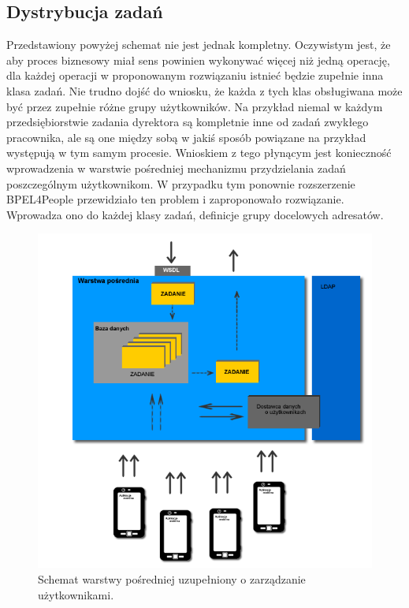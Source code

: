\subsection{Dystrybucja zadań}
Przedstawiony powyżej schemat nie jest jednak kompletny. Oczywistym jest, że aby proces biznesowy miał sens powinien wykonywać więcej niż jedną operację, dla każdej operacji w proponowanym rozwiązaniu istnieć będzie zupełnie inna klasa zadań. Nie trudno dojść do wniosku, że każda z tych klas obsługiwana może być przez zupełnie różne grupy użytkowników. Na przykład niemal w każdym przedsiębiorstwie zadania dyrektora są kompletnie inne od zadań zwykłego pracownika, ale są one między sobą w jakiś sposób powiązane na przykład występują w tym samym procesie. Wnioskiem z tego płynącym jest konieczność wprowadzenia w warstwie pośredniej mechanizmu przydzielania zadań poszczególnym użytkownikom. W przypadku tym ponownie rozszerzenie BPEL4People przewidziało ten problem i zaproponowało rozwiązanie. Wprowadza ono do każdej klasy zadań, definicje grupy docelowych adresatów. 

\begin{figure}[h]
\centerline{\includegraphics[scale=0.5]{middlewareUserDataProviderConceptDiagram}}
\caption{Schemat warstwy pośredniej uzupełniony o zarządzanie użytkownikami.}
\label{fig:middlewareUserDataProviderConceptDiagram}
\end{figure}

